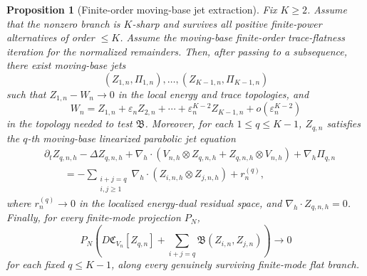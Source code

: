 \documentclass[11pt]{article}
\numberwithin{equation}{section}
\theoremstyle{plain}
\newtheorem{proposition}{Proposition}[section]
\theoremstyle{definition}
\theoremstyle{remark}
\newcommand{\nabh}{\nabla_h}
\newcommand{\calB}{\mathfrak B}
\newcommand{\calC}{\mathfrak C}
\begin{document}
\begin{proposition}[Finite-order moving-base jet extraction]
\label{pIII:prop:finite-order-moving-base-jet-extraction}
Fix \(K\ge2\).  Assume that the nonzero branch is \(K\)-sharp and survives all positive finite-power
alternatives of order \(\le K\).  Assume the moving-base finite-order trace-flatness iteration for the
normalized remainders.  Then, after passing to a subsequence, there exist moving-base jets
\[
        (Z_{1,n},\Pi_{1,n}),\ldots,(Z_{K-1,n},\Pi_{K-1,n})
\]
such that \(Z_{1,n}-W_n\to0\) in the local energy and trace topologies, and
\[
        W_n
        =
        Z_{1,n}+\varepsilon_nZ_{2,n}+\cdots+
        \varepsilon_n^{K-2}Z_{K-1,n}+o(\varepsilon_n^{K-2})
\]
in the topology needed to test \(\calB\).  Moreover, for each \(1\le q\le K-1\), \(Z_{q,n}\)
satisfies the \(q\)-th moving-base linearized parabolic jet equation
\[
\begin{aligned}
        &\partial_t Z_{q,n,h}-\Delta Z_{q,n,h}
        +\nabh\cdot(V_{n,h}\otimes Z_{q,n,h}+Z_{q,n,h}\otimes V_{n,h})
        +\nabh\Pi_{q,n} \\
        &\qquad
        =
        -\sum_{\substack{i+j=q\\ i,j\ge1}}
        \nabh\cdot(Z_{i,n,h}\otimes Z_{j,n,h})
        +r^{(q)}_n,
\end{aligned}
\]
where \(r^{(q)}_n\to0\) in the localized energy-dual residual space, and
\(\nabh\cdot Z_{q,n,h}=0\).  Finally, for every finite-mode projection \(P_N\),
\[
        P_N
        \left(
        D\calC_{V_n}[Z_{q,n}]
        +
        \sum_{i+j=q}\calB(Z_{i,n},Z_{j,n})
        \right)
        \to0
\]
for each fixed \(q\le K-1\), along every genuinely surviving finite-mode flat branch.
\end{proposition}
\end{document}
